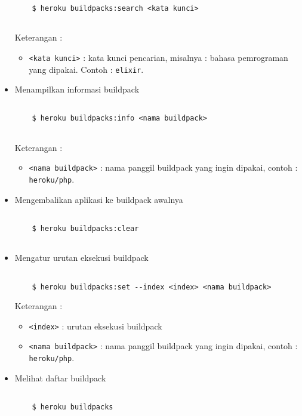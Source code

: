 \begin{itemize}
\begin{lstlisting}
	$ heroku buildpacks:search <kata kunci>
	
\end{lstlisting}
Keterangan :
\begin{itemize}
\item \texttt{<kata kunci>} : kata kunci pencarian, misalnya : bahasa pemrograman yang dipakai. Contoh : \texttt{elixir}.
\end{itemize}

\item Menampilkan informasi buildpack

\begin{lstlisting}

	$ heroku buildpacks:info <nama buildpack>
	
\end{lstlisting}
Keterangan :
\begin{itemize}
\item \texttt{<nama buildpack>} : nama panggil buildpack yang ingin dipakai, contoh : \texttt{heroku/php}.
\end{itemize}

\item Mengembalikan aplikasi ke buildpack awalnya

\begin{lstlisting}

	$ heroku buildpacks:clear
	
\end{lstlisting}

\item Mengatur urutan eksekusi buildpack

\begin{lstlisting}

	$ heroku buildpacks:set --index <index> <nama buildpack>

\end{lstlisting}
Keterangan :
\begin{itemize}
\item \texttt{<index>} : urutan eksekusi buildpack
\item \texttt{<nama buildpack>} : nama panggil buildpack yang ingin dipakai, contoh : \texttt{heroku/php}.
\end{itemize}

\item Melihat daftar buildpack

\begin{lstlisting}

	$ heroku buildpacks

\end{lstlisting}

\end{itemize}

